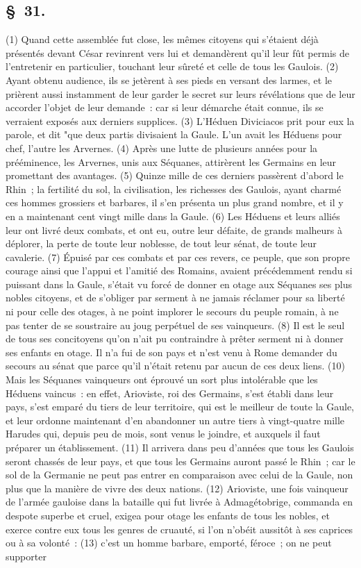 \documentclass[french,twoside]{book} %
\begin{document}
\subsection[{§ 31.}]{ \textsc{§ 31.} }
\noindent (1) Quand cette assemblée fut close, les mêmes citoyens qui s’étaient déjà présentés devant César revinrent vers lui et demandèrent qu’il leur fût permis de l’entretenir en particulier, touchant leur sûreté et celle de tous les Gaulois. (2) Ayant obtenu audience, ils se jetèrent à ses pieds en versant des larmes, et le prièrent aussi instamment de leur garder le secret sur leurs révélations que de leur accorder l’objet de leur demande : car si leur démarche était connue, ils se verraient exposés aux derniers supplices. (3) L'Héduen Diviciacos prit pour eux la parole, et dit "que deux partis divisaient la Gaule. L'un avait les Héduens pour chef, l’autre les Arvernes. (4) Après une lutte de plusieurs années pour la prééminence, les Arvernes, unis aux Séquanes, attirèrent les Germains en leur promettant des avantages. (5) Quinze mille de ces derniers passèrent d’abord le Rhin ; la fertilité du sol, la civilisation, les richesses des Gaulois, ayant charmé ces hommes grossiers et barbares, il s’en présenta un plus grand nombre, et il y en a maintenant cent vingt mille dans la Gaule. (6) Les Héduens et leurs alliés leur ont livré deux combats, et ont eu, outre leur défaite, de grands malheurs à déplorer, la perte de toute leur noblesse, de tout leur sénat, de toute leur cavalerie. (7) Épuisé par ces combats et par ces revers, ce peuple, que son propre courage ainsi que l’appui et l’amitié des Romains, avaient précédemment rendu si puissant dans la Gaule, s’était vu forcé de donner en otage aux Séquanes ses plus nobles citoyens, et de s’obliger par serment à ne jamais réclamer pour sa liberté ni pour celle des otages, à ne point implorer le secours du peuple romain, à ne pas tenter de se soustraire au joug perpétuel de ses vainqueurs. (8) Il est le seul de tous ses concitoyens qu’on n’ait pu contraindre à prêter serment ni à donner ses enfants en otage. Il n’a fui de son pays et n’est venu à Rome demander du secours au sénat que parce qu’il n’était retenu par aucun de ces deux liens. (10) Mais les Séquanes vainqueurs ont éprouvé un sort plus intolérable que les Héduens vaincus : en effet, Arioviste, roi des Germains, s’est établi dans leur pays, s’est emparé du tiers de leur territoire, qui est le meilleur de toute la Gaule, et leur ordonne maintenant d’en abandonner un autre tiers à vingt-quatre mille Harudes qui, depuis peu de mois, sont venus le joindre, et auxquels il faut préparer un établissement. (11) Il arrivera dans peu d’années que tous les Gaulois seront chassés de leur pays, et que tous les Germains auront passé le Rhin ; car le sol de la Germanie ne peut pas entrer en comparaison avec celui de la Gaule, non plus que la manière de vivre des deux nations. (12) Arioviste, une fois vainqueur de l’armée gauloise dans la bataille qui fut livrée à Admagétobrige, commanda en despote superbe et cruel, exigea pour otage les enfants de tous les nobles, et exerce contre eux tous les genres de cruauté, si l’on n’obéit aussitôt à ses caprices ou à sa volonté : (13) c’est un homme barbare, emporté, féroce ; on ne peut supporter 
\end{document}
